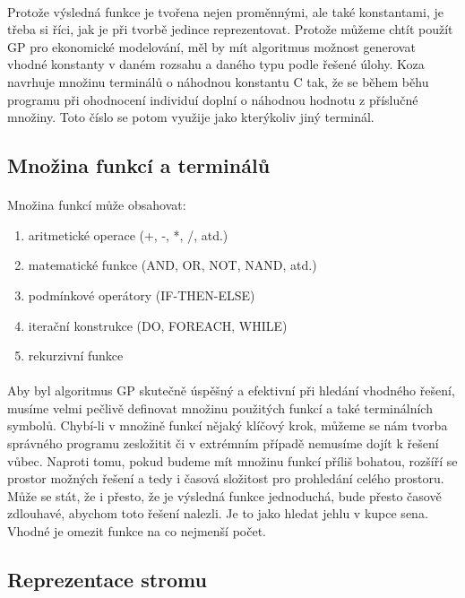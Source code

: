 \documentclass[bc,male,java,dept460]{diploma}		%
\begin{document}
\paragraph*{}
Protože výsledná funkce je tvořena nejen proměnnými, ale také konstantami, je třeba si říci, jak je při tvorbě jedince reprezentovat. Protože můžeme chtít použít GP pro ekonomické modelování, měl by mít algoritmus možnost generovat vhodné konstanty v daném rozsahu a daného typu podle řešené úlohy. Koza navrhuje množinu terminálů o náhodnou konstantu C tak, že se během běhu programu při ohodnocení individuí doplní o náhodnou hodnotu z příslučné množiny. Toto číslo se potom využije jako kterýkoliv jiný terminál.

\subsection{Množina funkcí a terminálů}
\paragraph*{}
Množina funkcí může obsahovat:
\begin{enumerate}
\item aritmetické operace (+, -, *, /, atd.)
\item matematické funkce (AND, OR, NOT, NAND, atd.)
\item podmínkové operátory (IF-THEN-ELSE)
\item iterační konstrukce (DO, FOREACH, WHILE)
\item rekurzivní funkce
\end{enumerate}

\paragraph*{}
Aby byl algoritmus GP skutečně úspěšný a efektivní při hledání vhodného řešení, musíme velmi pečlivě definovat množinu použitých funkcí a také terminálních symbolů. Chybí-li v množině funkcí nějaký klíčový krok, můžeme se nám tvorba správného programu zesložitit či v extrémním případě nemusíme dojít k řešení vůbec. Naproti tomu, pokud budeme mít množinu funkcí příliš bohatou, rozšíří se prostor možných řešení a tedy i časová složitost pro prohledání celého prostoru. Může se stát, že i přesto, že je výsledná funkce jednoduchá, bude přesto časově zdlouhavé, abychom toto řešení nalezli. Je to jako hledat jehlu v kupce sena. Vhodné je omezit funkce na co nejmenší počet.

\subsection{Reprezentace stromu}
\end{document}
